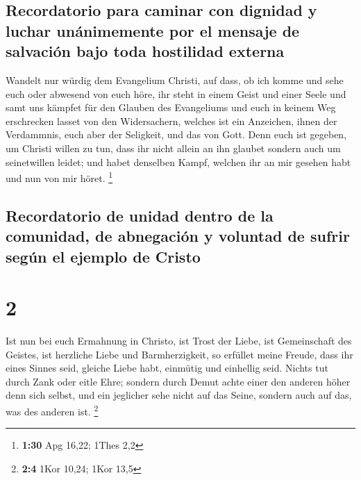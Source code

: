 \hypertarget{recordatorio-para-caminar-con-dignidad-y-luchar-unuxe1nimemente-por-el-mensaje-de-salvaciuxf3n-bajo-toda-hostilidad-externa}{%
\subsection{Recordatorio para caminar con dignidad y luchar unánimemente
por el mensaje de salvación bajo toda hostilidad
externa}\label{recordatorio-para-caminar-con-dignidad-y-luchar-unuxe1nimemente-por-el-mensaje-de-salvaciuxf3n-bajo-toda-hostilidad-externa}}

 Wandelt nur würdig dem Evangelium Christi, auf dass, ob
ich komme und sehe euch oder abwesend von euch höre, ihr steht in einem
Geist und einer Seele und samt uns kämpfet für den Glauben des
Evangeliums  und euch in keinem Weg erschrecken lasset
von den Widersachern, welches ist ein Anzeichen, ihnen der Verdammnis,
euch aber der Seligkeit, und das von Gott.  Denn euch ist
gegeben, um Christi willen zu tun, dass ihr nicht allein an ihn glaubet
sondern auch um seinetwillen leidet;  und habet denselben
Kampf, welchen ihr an mir gesehen habt und nun von mir höret.
\footnote{\textbf{1:30} Apg 16,22; 1Thes 2,2}

\hypertarget{recordatorio-de-unidad-dentro-de-la-comunidad-de-abnegaciuxf3n-y-voluntad-de-sufrir-seguxfan-el-ejemplo-de-cristo}{%
\subsection{Recordatorio de unidad dentro de la comunidad, de abnegación
y voluntad de sufrir según el ejemplo de
Cristo}\label{recordatorio-de-unidad-dentro-de-la-comunidad-de-abnegaciuxf3n-y-voluntad-de-sufrir-seguxfan-el-ejemplo-de-cristo}}

\hypertarget{section-1}{%
\section{2}\label{section-1}}

 Ist nun bei euch Ermahnung in Christo, ist Trost der
Liebe, ist Gemeinschaft des Geistes, ist herzliche Liebe und
Barmherzigkeit,  so erfüllet meine Freude, dass ihr eines
Sinnes seid, gleiche Liebe habt, einmütig und einhellig seid.
 Nichts tut durch Zank oder eitle Ehre; sondern durch
Demut achte einer den anderen höher denn sich selbst,  und
ein jeglicher sehe nicht auf das Seine, sondern auch auf das, was des
anderen ist. \footnote{\textbf{2:4} 1Kor 10,24; 1Kor 13,5}

